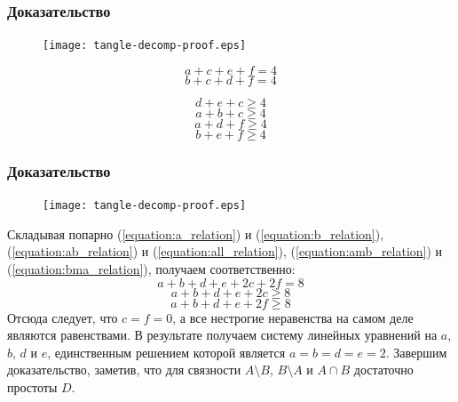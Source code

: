 \documentclass[dvips, intlimits, 9pt, unicode, notheorems]{beamer}
\theoremstyle{plain}
\theoremstyle{definition}
\begin{document}
	\begin{frame}
		\frametitle{Доказательство}

		\begin{figure}[H]
			\centering
			\texttt{[image: tangle-decomp-proof.eps]}
		\end{figure}

		\begin{equation}
			\label{equation:a_relation}
			a + c + e + f = 4
		\end{equation}
		\begin{equation}
			\label{equation:b_relation}
			b + c + d + f = 4
		\end{equation}

		\begin{equation}
			\label{equation:ab_relation}
			d + e + c \ge 4
		\end{equation}
		\begin{equation}
			\label{equation:all_relation}
			a + b + c \ge 4
		\end{equation}
		\begin{equation}
			\label{equation:amb_relation}
			a + d + f \ge 4
		\end{equation}
		\begin{equation}
			\label{equation:bma_relation}
			b + e + f \ge 4
		\end{equation}
	\end{frame}

	\begin{frame}
		\frametitle{Доказательство}

		\begin{figure}[H]
			\centering
			\texttt{[image: tangle-decomp-proof.eps]}
		\end{figure}

		Складывая попарно (\ref{equation:a_relation}) и (\ref{equation:b_relation}),
		(\ref{equation:ab_relation}) и (\ref{equation:all_relation}),
		(\ref{equation:amb_relation}) и (\ref{equation:bma_relation}), получаем соответственно:
		\[a + b + d + e + 2c + 2f = 8\]
		\[a + b + d + e + 2c \ge 8\]
		\[a + b + d + e + 2f \ge 8\]
		Отсюда следует, что $c = f = 0$, а все нестрогие неравенства на самом деле являются равенствами. В результате
		получаем систему линейных уравнений на $a$, $b$, $d$ и $e$, единственным решением которой является
		$a = b = d = e = 2$. Завершим доказательство, заметив, что для связности $A\setminus B$, $B\setminus A$ и
		$A\cap B$ достаточно простоты $D$.
	\end{frame}
\end{document}

